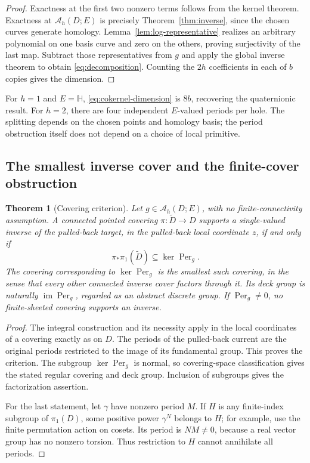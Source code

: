 \documentclass[11pt,a4paper]{article}
\numberwithin{equation}{section}
\newtheorem{theorem}{Theorem}[section]
\theoremstyle{definition}
\theoremstyle{remark}
\newcommand{\HH}{\mathbb H}
\newcommand{\AM}{\mathcal A_h}
\newcommand{\Per}{\operatorname{Per}}
\begin{document}
\begin{proof}
Exactness at the first two nonzero terms follows from the kernel theorem.
Exactness at $\AM(D;E)$ is precisely Theorem~\ref{thm:inverse}, since the
chosen curves generate homology. Lemma~\ref{lem:log-representative} realizes
an arbitrary polynomial on one basis curve and zero on the others, proving
surjectivity of the last map. Subtract those representatives from $g$ and
apply the global inverse theorem to obtain \eqref{eq:decomposition}. Counting
the $2h$ coefficients in each of $b$ copies gives the dimension.
\end{proof}

For $h=1$ and $E=\HH$, \eqref{eq:cokernel-dimension} is $8b$, recovering the
quaternionic result. For $h=2$, there are four independent $E$-valued periods
per hole. The splitting depends on the chosen points and homology basis; the
period obstruction itself does not depend on a choice of local primitive.

\subsection{The smallest inverse cover and the finite-cover obstruction}

\begin{theorem}[Covering criterion]\label{thm:covers}
Let $g\in\AM(D;E)$, with no finite-connectivity assumption. A connected pointed
covering $\pi:\widetilde D\to D$ supports a single-valued inverse of the pulled-back
target, in the pulled-back local coordinate $z$, if and only if
\[
 \pi_*\pi_1(\widetilde D)\subseteq\ker\Per_g.
\]
The covering corresponding to $\ker\Per_g$ is the smallest such covering, in
the sense that every other connected inverse cover factors through it.
Its deck group is naturally $\operatorname{im}\Per_g$, regarded as an abstract
discrete group. If $\Per_g\ne0$, no finite-sheeted covering supports an inverse.
\end{theorem}

\begin{proof}
The integral construction and its necessity apply in the local coordinates
of a covering exactly as on $D$. The periods of the pulled-back current are
the original periods restricted to the image of its fundamental group. This
proves the criterion. The subgroup $\ker\Per_g$ is normal, so covering-space
classification gives the stated regular covering and deck group. Inclusion
of subgroups gives the factorization assertion.

For the last statement, let $\gamma$ have nonzero period $M$. If $H$ is any
finite-index subgroup of $\pi_1(D)$, some positive power $\gamma^N$ belongs to
$H$; for example, use the finite permutation action on cosets. Its period is
$NM\ne0$, because a real vector group has no nonzero torsion. Thus restriction
to $H$ cannot annihilate all periods.
\end{proof}
\end{document}

